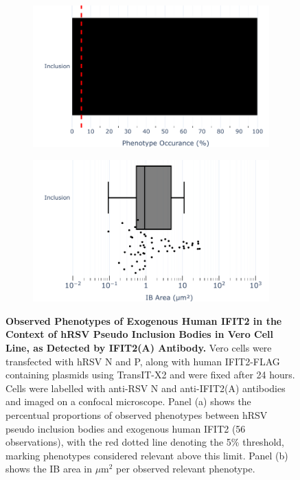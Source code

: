 \begin{figure}
    \begin{subfigure}{0.495\textwidth}
        \caption{}
        \includegraphics[width=1\linewidth]{09. Chapter 4/Figs/01. pIB/03. IFIT2/04. IFIT2-FLAG/01. IFIT2A/01. bar_i2a_hnhp.pdf} 
    \end{subfigure}
    \begin{subfigure}{0.495\textwidth}
        \caption{}
        \includegraphics[width=1\linewidth]{09. Chapter 4/Figs/01. pIB/03. IFIT2/04. IFIT2-FLAG/01. IFIT2A/02. box_i2a_hnhp.pdf}
    \end{subfigure}
    \caption[Observed Phenotypes of Exogenous Human IFIT2 in the Context of hRSV Pseudo Inclusion Bodies in Vero Cell Line, as Detected by IFIT2(A) Antibody.]{\textbf{Observed Phenotypes of Exogenous Human IFIT2 in the Context of hRSV Pseudo Inclusion Bodies in Vero Cell Line, as Detected by IFIT2(A) Antibody.} Vero cells were transfected with hRSV N and P, along with human IFIT2-FLAG containing plasmids using TransIT-X2 and were fixed after 24 hours. Cells were labelled with anti-RSV N and anti-IFIT2(A) antibodies and imaged on a confocal microscope. Panel (a) shows the percentual proportions of observed phenotypes between hRSV pseudo inclusion bodies and exogenous human IFIT2 (56 observations), with the red dotted line denoting the 5\% threshold, marking phenotypes considered relevant above this limit. Panel (b) shows the IB area in \(\mu \mbox{m}^2\) per observed relevant phenotype.}
    \label{fig:Observed Phenotypes of Exogenous Human IFIT2 in the Context of hRSV Pseudo Inclusion Bodies in Vero Cell Line, as Detected by IFIT2(A) Antibody}
\end{figure}

